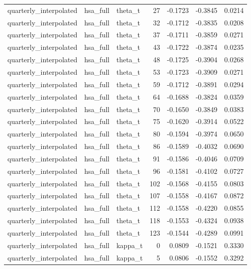 \begin{tabular}{lllrrrr}
quarterly\_interpolated & hsa\_full & theta\_t & 27 & -0.1723 & -0.3845 & 0.0214 \\
quarterly\_interpolated & hsa\_full & theta\_t & 32 & -0.1712 & -0.3835 & 0.0208 \\
quarterly\_interpolated & hsa\_full & theta\_t & 37 & -0.1711 & -0.3859 & 0.0271 \\
quarterly\_interpolated & hsa\_full & theta\_t & 43 & -0.1722 & -0.3874 & 0.0235 \\
quarterly\_interpolated & hsa\_full & theta\_t & 48 & -0.1725 & -0.3904 & 0.0268 \\
quarterly\_interpolated & hsa\_full & theta\_t & 53 & -0.1723 & -0.3909 & 0.0271 \\
quarterly\_interpolated & hsa\_full & theta\_t & 59 & -0.1712 & -0.3891 & 0.0294 \\
quarterly\_interpolated & hsa\_full & theta\_t & 64 & -0.1688 & -0.3824 & 0.0359 \\
quarterly\_interpolated & hsa\_full & theta\_t & 70 & -0.1650 & -0.3849 & 0.0383 \\
quarterly\_interpolated & hsa\_full & theta\_t & 75 & -0.1620 & -0.3914 & 0.0522 \\
quarterly\_interpolated & hsa\_full & theta\_t & 80 & -0.1594 & -0.3974 & 0.0650 \\
quarterly\_interpolated & hsa\_full & theta\_t & 86 & -0.1589 & -0.4032 & 0.0690 \\
quarterly\_interpolated & hsa\_full & theta\_t & 91 & -0.1586 & -0.4046 & 0.0709 \\
quarterly\_interpolated & hsa\_full & theta\_t & 96 & -0.1581 & -0.4102 & 0.0727 \\
quarterly\_interpolated & hsa\_full & theta\_t & 102 & -0.1568 & -0.4155 & 0.0803 \\
quarterly\_interpolated & hsa\_full & theta\_t & 107 & -0.1558 & -0.4167 & 0.0872 \\
quarterly\_interpolated & hsa\_full & theta\_t & 112 & -0.1558 & -0.4220 & 0.0855 \\
quarterly\_interpolated & hsa\_full & theta\_t & 118 & -0.1553 & -0.4324 & 0.0938 \\
quarterly\_interpolated & hsa\_full & theta\_t & 123 & -0.1544 & -0.4289 & 0.0991 \\
quarterly\_interpolated & hsa\_full & kappa\_t & 0 & 0.0809 & -0.1521 & 0.3330 \\
quarterly\_interpolated & hsa\_full & kappa\_t & 5 & 0.0806 & -0.1552 & 0.3292 \\

\end{tabular}
